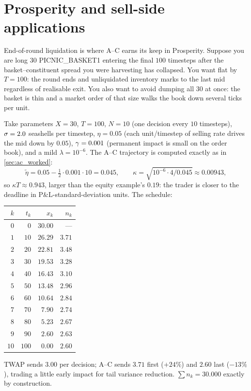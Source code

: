 \section{Prosperity and sell-side applications}
\label{sec:ac_applications}

\begin{prosperitybox}
End-of-round liquidation is where A--C earns its keep in
Prosperity. Suppose you are long $30$ PICNIC\_BASKET1 entering the
final $100$ timesteps after the basket--constituent spread you
were harvesting has collapsed. You want flat by $T = 100$: the
round ends and unliquidated inventory marks to the last mid
regardless of realisable exit. You also want to avoid dumping all
$30$ at once: the basket is thin and a market order of that
size walks the book down several ticks per unit.

Take parameters $X = 30$, $T = 100$, $N = 10$ (one decision every
$10$ timesteps), $\sigma = 2.0$ seashells per timestep,
$\eta = 0.05$ (each unit/timestep of selling rate drives the mid
down by $0.05$), $\gamma = 0.001$ (permanent impact is small on
the order book), and a mild $\lambda = 10^{-6}$. The A--C
trajectory is computed exactly as in \cref{sec:ac_worked}:
\[
  \tilde\eta = 0.05 - \tfrac{1}{2}\cdot 0.001\cdot 10 = 0.045,
  \qquad \kappa = \sqrt{10^{-6}\cdot 4 / 0.045} \approx 0.00943,
\]
so $\kappa T \approx 0.943$, larger than the equity example's
$0.19$: the trader is closer to the deadline in P\&L-standard-deviation
units. The schedule:
\begin{center}
\begin{tabular}{rrrr}\toprule
  $k$ & $t_k$ & $x_k$ & $n_k$ \\ \midrule
  $0$  & $0$   & $30.00$ & --- \\
  $1$  & $10$  & $26.29$ & $3.71$ \\
  $2$  & $20$  & $22.81$ & $3.48$ \\
  $3$  & $30$  & $19.53$ & $3.28$ \\
  $4$  & $40$  & $16.43$ & $3.10$ \\
  $5$  & $50$  & $13.48$ & $2.96$ \\
  $6$  & $60$  & $10.64$ & $2.84$ \\
  $7$  & $70$  & $7.90$  & $2.74$ \\
  $8$  & $80$  & $5.23$  & $2.67$ \\
  $9$  & $90$  & $2.60$  & $2.63$ \\
  $10$ & $100$ & $0.00$  & $2.60$ \\ \bottomrule
\end{tabular}
\end{center}
TWAP sends $3.00$ per decision; A--C sends $3.71$ first ($+24\%$)
and $2.60$ last ($-13\%$), trading a little early impact for tail
variance reduction. $\sum n_k = 30.000$ exactly by construction.


\end{prosperitybox}
